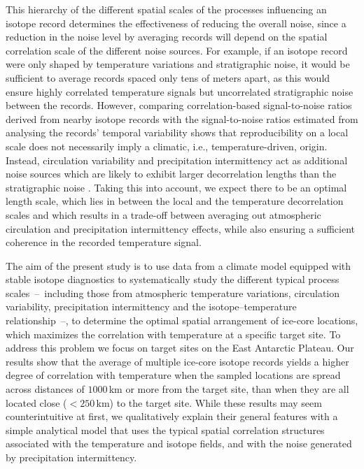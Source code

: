 \documentclass[draft]{agujournal2019}
\begin{document}
This hierarchy of the different spatial scales of the processes influencing an
isotope record determines the effectiveness of reducing the overall noise, since
a reduction in the noise level by averaging records will depend on the spatial
correlation scale of the different noise sources. For example, if an isotope
record were only shaped by temperature variations and stratigraphic noise, it
would be sufficient to average records spaced only tens of meters apart, as this
would ensure highly correlated temperature signals but uncorrelated
stratigraphic noise between the records. However, comparing correlation-based
signal-to-noise ratios derived from nearby isotope records
\cite{Munch2016,Munch2017} with the signal-to-noise ratios estimated from
analysing the records' temporal variability \cite{Laepple2018} shows that
reproducibility on a local scale does not necessarily imply a climatic, i.e.,
temperature-driven, origin. Instead, circulation variability and precipitation
intermittency act as additional noise sources which are likely to exhibit larger
decorrelation lengths than the stratigraphic noise
\cite{Laepple2018,Munch2018a}. Taking this into account, we expect there to be
an optimal length scale, which lies in between the local and the temperature
decorrelation scales and which results in a trade-off between averaging out
atmospheric circulation and precipitation intermittency effects, while also
ensuring a sufficient coherence in the recorded temperature signal.

The aim of the present study is to use data from a climate model equipped with
stable isotope diagnostics to systematically study the different typical process
scales~--~including those from atmospheric temperature variations, circulation
variability, precipitation intermittency and the isotope--temperature
relationship~--, to determine the optimal spatial arrangement of ice-core
locations, which maximizes the correlation with temperature at a specific target
site. To address this problem we focus on target sites on the East Antarctic
Plateau. Our results show that the average of multiple ice-core isotope records
yields a higher degree of correlation with temperature when the sampled
locations are spread across distances of $1000$\,km or more from the target
site, than when they are all located close ($<250$\,km) to the target
site. While these results may seem counterintuitive at first, we qualitatively
explain their general features with a simple analytical model that uses the
typical spatial correlation structures associated with the temperature and
isotope fields, and with the noise generated by precipitation intermittency.
\end{document}
